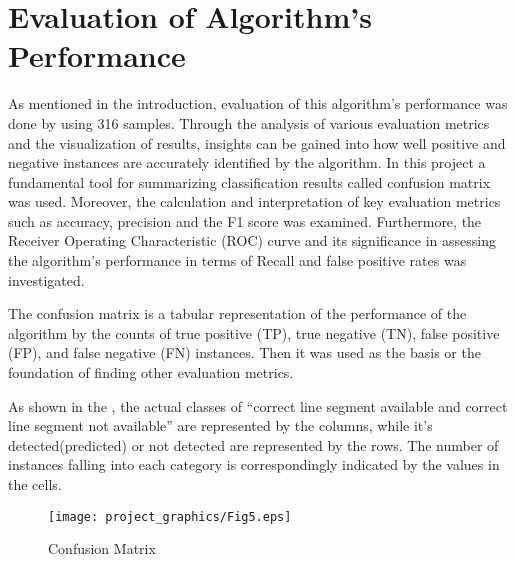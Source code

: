 \documentclass[]{iat}
\begin{document}
\section{Evaluation of Algorithm’s Performance }

As mentioned in the introduction, evaluation of this algorithm's performance was done by using 316 samples. Through the analysis of various evaluation metrics and the visualization of results, insights can be gained into how well positive and negative instances are accurately identified by the algorithm. In this project a fundamental tool for summarizing classification results called confusion matrix was used. Moreover, the calculation and interpretation of key evaluation metrics such as accuracy, precision and the F1 score was examined. Furthermore, the Receiver Operating Characteristic (ROC) curve and its significance in assessing the algorithm's performance in terms of Recall and false positive rates was investigated. 
\par
The confusion matrix is a tabular representation of the performance of the algorithm by the counts of true positive (TP), true negative (TN), false positive (FP), and false negative (FN) instances. Then it was used as the basis or the foundation of finding other evaluation metrics. 
\par
As shown in the , the actual classes of “correct line segment available and correct line segment not available” are represented by the columns, while it’s detected(predicted) or not detected are represented by the rows. The number of instances falling into each category is correspondingly indicated by the values in the cells. 
\par
\FloatBarrier
\begin{figure}[h]
    
	\texttt{[image: project\_graphics/Fig5.eps]}
	\caption{Confusion Matrix}
	\label{fig:fig5}
\end{figure}
\end{document}
